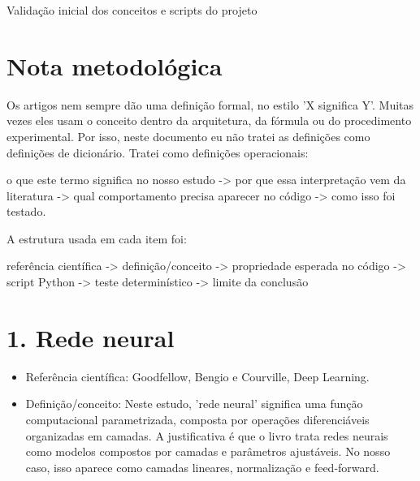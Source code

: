 

Validação inicial dos conceitos e scripts do projeto



\section{Nota metodológica}






Os artigos nem sempre dão uma definição formal, no estilo 'X significa Y'. Muitas vezes eles usam o conceito dentro da arquitetura, da fórmula ou do procedimento experimental. Por isso, neste documento eu não tratei as definições como definições de dicionário. Tratei como definições operacionais:





o que este termo significa no nosso estudo -> por que essa interpretação vem da literatura -> qual comportamento precisa aparecer no código -> como isso foi testado.



A estrutura usada em cada item foi:




referência científica -> definição/conceito -> propriedade esperada no código -> script Python -> teste determinístico -> limite da conclusão




\section{1. Rede neural}


\begin{itemize}
\item Referência científica:
Goodfellow, Bengio e Courville, Deep Learning.
\end{itemize}

\begin{itemize}
\item Definição/conceito:
Neste estudo, 'rede neural' significa uma função computacional parametrizada,
composta por operações diferenciáveis organizadas em camadas. A justificativa é
que o livro trata redes neurais como modelos compostos por camadas e
parâmetros ajustáveis. No nosso caso, isso aparece como camadas lineares,
normalização e feed-forward.
\end{itemize}

